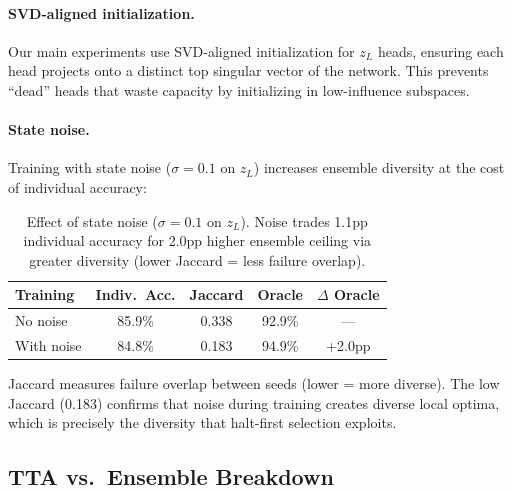 \paragraph{SVD-aligned initialization.} Our main experiments use SVD-aligned
initialization for $z_L$ heads, ensuring each head projects onto a distinct top
singular vector of the network. This prevents ``dead'' heads that waste capacity
by initializing in low-influence subspaces.

\paragraph{State noise.} Training with state noise ($\sigma{=}0.1$ on $z_L$)
increases ensemble diversity at the cost of individual accuracy:
%
\begin{table}[h]
\centering
\begin{tabular}{lcccc}
\toprule
Training & Indiv.\ Acc. & Jaccard & Oracle & $\Delta$ Oracle \\
\midrule
No noise & 85.9\% & 0.338 & 92.9\% & --- \\  %
With noise & 84.8\% & 0.183 & 94.9\% & +2.0pp \\  %
\bottomrule
\end{tabular}
\caption{Effect of state noise ($\sigma{=}0.1$ on $z_L$). Noise trades 1.1pp
individual accuracy for 2.0pp higher ensemble ceiling via greater diversity
(lower Jaccard = less failure overlap).}
\label{tab:state-noise}
\end{table}
%
Jaccard measures failure overlap between seeds (lower = more diverse). The low
Jaccard (0.183) confirms that noise during training creates diverse local
optima, which is precisely the diversity that halt-first selection exploits.

\subsection{TTA vs.\ Ensemble Breakdown}

